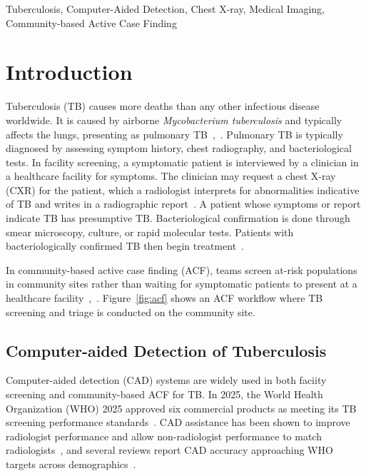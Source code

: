 \documentclass[conference, letterpaper]{IEEEtran}
\begin{document}
\begin{IEEEkeywords}
Tuberculosis, Computer-Aided Detection, Chest X-ray, Medical Imaging, Community-based Active Case Finding
\end{IEEEkeywords}

\IEEEpeerreviewmaketitle

\section{Introduction}

Tuberculosis (TB) causes more deaths than any other infectious disease worldwide. It is caused by airborne \textit{Mycobacterium tuberculosis} and typically affects the lungs, presenting as pulmonary TB~\cite{who_global_tb_2024},~\cite{pai2016tb}. Pulmonary TB is typically diagnosed by assessing symptom history, chest radiography, and bacteriological tests. In facility screening, a symptomatic patient is interviewed by a clinician in a healthcare facility for symptoms. The clinician may request a chest X-ray (CXR) for the patient, which a radiologist interprets for abnormalities indicative of TB and writes in a radiographic report~\cite{who_cad_approval_2025}. A patient whose symptoms or report indicate TB has presumptive TB. Bacteriological confirmation is done through smear microscopy, culture, or rapid molecular tests. Patients with bacteriologically confirmed TB then begin treatment~\cite{who_global_tb_2024}.

In community-based active case finding (ACF), teams screen at-risk populations in community sites rather than waiting for symptomatic patients to present at a healthcare facility~\cite{who_screening_2021},~\cite{who_cad_approval_2025}. Figure~\ref{fig:acf} shows an ACF workflow where TB screening and triage is conducted on the community site.

\subsection{Computer-aided Detection of Tuberculosis}

Computer-aided detection (CAD) systems are widely used in both faciity screening and community-based ACF for TB. In 2025, the World Health Organization (WHO) 2025 approved six commercial products as meeting its TB screening performance standards~\cite{who_cad_approval_2025}. CAD assistance has been shown to improve radiologist performance and allow non-radiologist performance to match radiologists~\cite{anderson2024deep}, and several reviews report CAD accuracy approaching WHO targets across demographics~\cite{ahmad2023systematic, scott2024tb_cad_africa, han2025tb_meta, marquez2025philippines}.
\end{document}
